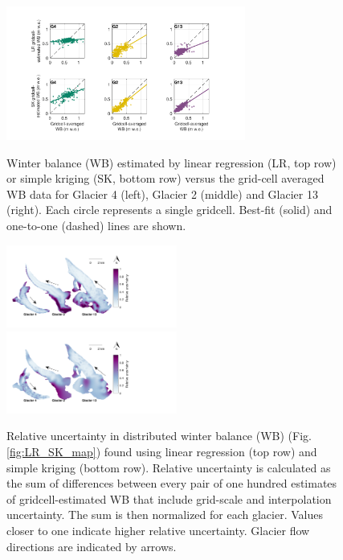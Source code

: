 \documentclass[review,oneside, letterpaper]{igs}
\begin{document}
\begin{figure}
	\centering
	\includegraphics[width =0.7\textwidth]{observedVSestimated_S2.pdf}\\
	\caption{Winter balance (WB) estimated by linear regression (LR, top row) or simple kriging (SK, bottom row) versus the grid-cell averaged WB data for Glacier 4 (left), Glacier 2 (middle) and Glacier 13 (right). Each circle represents a single gridcell. Best-fit (solid) and one-to-one (dashed) lines are shown.}
	\label{fig:observedVSestimated_S2}
\end{figure}

\begin{figure}
	\centering
	\includegraphics[width =0.5\textwidth]{SpatialVar_LR.pdf}\\
	\includegraphics[width =0.5\textwidth]{SpatialVar_SK.pdf}\\
	\caption{Relative uncertainty in distributed winter balance (WB) (Fig. \ref{fig:LR_SK_map}) found using linear regression (top row) and simple kriging (bottom row). Relative uncertainty is calculated as the sum of differences between every pair of one hundred estimates of gridcell-estimated WB that include grid-scale and interpolation uncertainty. The sum is then normalized for each glacier. Values closer to one indicate higher relative uncertainty. Glacier flow directions are indicated by arrows.}
	\label{fig:WSMBspatialvar}
\end{figure}
\end{document}
